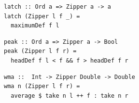 \documentclass{beamer}
\begin{document}
\begin{frame}[fragile]
\begin{overprint}
\begin{verbatim}
latch :: Ord a => Zipper a -> a
latch (Zipper l f _) =
  maximumDef f l
\end{verbatim}
\begin{verbatim}
peak :: Ord a => Zipper a -> Bool
peak (Zipper l f r) =
  headDef f l < f && f > headDef f r
\end{verbatim}
\begin{verbatim}
wma ::  Int -> Zipper Double -> Double
wma n (Zipper l f r) =
  average $ take n l ++ f : take n r
\end{verbatim}
\end{overprint}

\bigskip


\end{frame}
\end{document}
